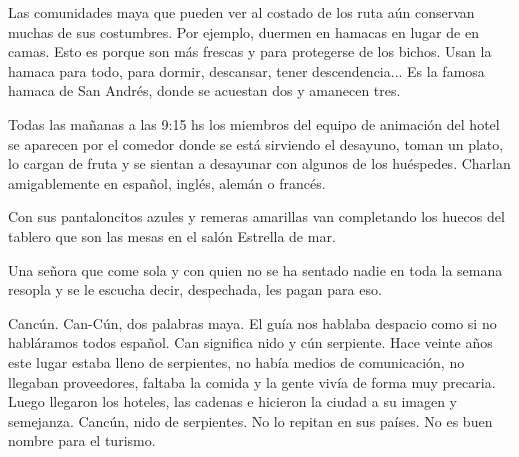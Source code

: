 \documentclass[12pt,twoside,openright,a5paper]{book}
\begin{document}
\hrulefill\hspace{0.2cm} \decofourleft\decofourright \hspace{0.2cm} \hrulefill
\vspace{0.5cm}

Las comunidades maya que pueden ver al costado de los ruta aún conservan
muchas de sus costumbres. Por ejemplo, duermen en hamacas en lugar de en
camas. Esto es porque son más frescas y para protegerse de los bichos. Usan la hamaca
para todo, para dormir, descansar, tener descendencia... Es la famosa hamaca de
San Andrés, donde se acuestan dos y amanecen tres.

\vspace{0.5cm}

\hrulefill\hspace{0.2cm} \decofourleft\decofourright \hspace{0.2cm} \hrulefill
\vspace{0.5cm}

Todas las mañanas a las 9:15 hs los miembros del equipo de animación del
hotel se aparecen por el comedor donde se está sirviendo el desayuno, toman
un plato, lo cargan de fruta y se sientan a desayunar con algunos de los
huéspedes. Charlan amigablemente en español, inglés, alemán o francés.

Con sus pantaloncitos azules y remeras amarillas van completando los huecos
del tablero que son las mesas en el salón Estrella de mar.

Una señora que come sola y con quien no se ha sentado nadie en toda la
semana resopla y se le escucha decir, despechada, les pagan para eso.

\vspace{0.5cm}

\hrulefill\hspace{0.2cm} \decofourleft\decofourright \hspace{0.2cm} \hrulefill
\vspace{0.5cm}

Cancún. Can-Cún, dos palabras maya. El guía nos
hablaba despacio como si no habláramos todos español. Can significa nido
y cún serpiente. Hace veinte años este lugar estaba lleno de serpientes,
no había medios de comunicación, no llegaban proveedores, faltaba la
comida y la gente vivía de forma muy precaria. Luego llegaron los hoteles,
las cadenas e hicieron la ciudad a su imagen y semejanza. Cancún, nido de
serpientes. No lo repitan en sus países. No es buen nombre para el turismo.
\end{document}

